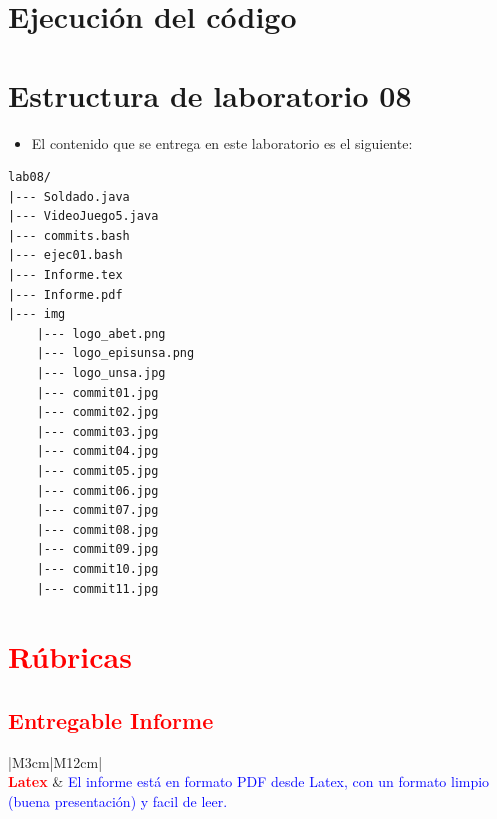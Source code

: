 \documentclass{article}
\newcommand{\itemPracticeNumber}{08}
\begin{document}
\section{Ejecución del código}

\pagebreak

\section{Estructura de laboratorio \itemPracticeNumber}
\begin{itemize}
	\item El contenido que se entrega en este laboratorio es el siguiente:
\end{itemize}
\begin{lstlisting}[style=ascii-tree]
lab08/
|--- Soldado.java
|--- VideoJuego5.java
|--- commits.bash
|--- ejec01.bash
|--- Informe.tex
|--- Informe.pdf
|--- img
	|--- logo_abet.png
	|--- logo_episunsa.png
	|--- logo_unsa.jpg
	|--- commit01.jpg
	|--- commit02.jpg
	|--- commit03.jpg
	|--- commit04.jpg
	|--- commit05.jpg
	|--- commit06.jpg
	|--- commit07.jpg
	|--- commit08.jpg
	|--- commit09.jpg
	|--- commit10.jpg
	|--- commit11.jpg
\end{lstlisting}
\pagebreak

\section{\textcolor{red}{Rúbricas}}

\subsection{\textcolor{red}{Entregable Informe}}
\begin{table}[H]
	\caption{Tipo de Informe}
	\setlength{\tabcolsep}{0.5em} %
	{\renewcommand{\arraystretch}{1.5}%
		\begin{tabular}{|M{3cm}|M{12cm}|}
			\hline
			                                                                                                      \\
			\hline
			\textbf{\textcolor{red}{Latex}} & \textcolor{blue}{El informe está en formato PDF desde Latex,  con un formato limpio (buena presentación) y facil de leer.} \\
			\hline
		\end{tabular}
	}
\end{table}
\end{document}
